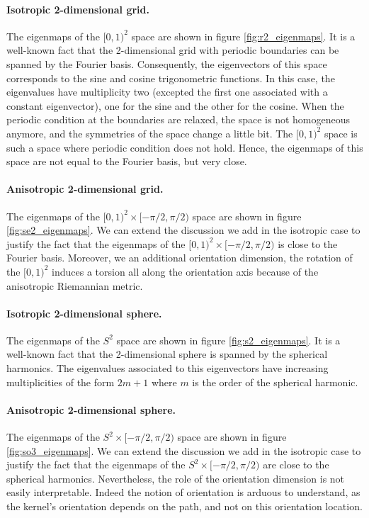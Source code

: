 \documentclass{article}
\begin{document}
\paragraph{Isotropic 2-dimensional grid.} The eigenmaps of the $[0,1)^2$ space are shown in figure \ref{fig:r2_eigenmaps}. It is a well-known fact that the 2-dimensional grid with periodic boundaries can be spanned by the Fourier basis. Consequently, the eigenvectors of this space corresponds to the sine and cosine trigonometric functions. In this case, the eigenvalues have multiplicity two (excepted the first one associated with a constant eigenvector), one for the sine and the other for the cosine. When the periodic condition at the boundaries are relaxed, the space is not homogeneous anymore, and the symmetries of the space change a little bit. The $[0,1)^2$ space is such a space where periodic condition does not hold. Hence, the eigenmaps of this space are not equal to the Fourier basis, but very close.

\paragraph{Anisotropic 2-dimensional grid.} The eigenmaps of the $[0,1)^2 \times [-\pi/2, \pi/2)$ space are shown in figure \ref{fig:se2_eigenmaps}. We can extend the discussion we add in the isotropic case to justify the fact that the eigenmaps of the $[0,1)^2 \times [-\pi/2, \pi/2)$ is close to the Fourier basis. Moreover, we an additional orientation dimension, the rotation of the $[0,1)^2$ induces a torsion all along the orientation axis because of the anisotropic Riemannian metric.

\paragraph{Isotropic 2-dimensional sphere.} The eigenmaps of the $S^2$ space are shown in figure \ref{fig:s2_eigenmaps}. It is a well-known fact that the 2-dimensional sphere is spanned by the spherical harmonics. The eigenvalues associated to this eigenvectors have increasing multiplicities of the form $2m + 1$ where $m$ is the order of the spherical harmonic.

\paragraph{Anisotropic 2-dimensional sphere.} The eigenmaps of the $S^2 \times [-\pi/2, \pi/2)$ space are shown in figure \ref{fig:so3_eigenmaps}. We can extend the discussion we add in the isotropic case to justify the fact that the eigenmaps of the $S^2 \times [-\pi/2, \pi/2)$ are close to the spherical harmonics. Nevertheless, the role of the orientation dimension is not easily interpretable. Indeed the notion of orientation is arduous to understand, as the kernel's orientation depends on the path, and not on this orientation location.
\end{document}
